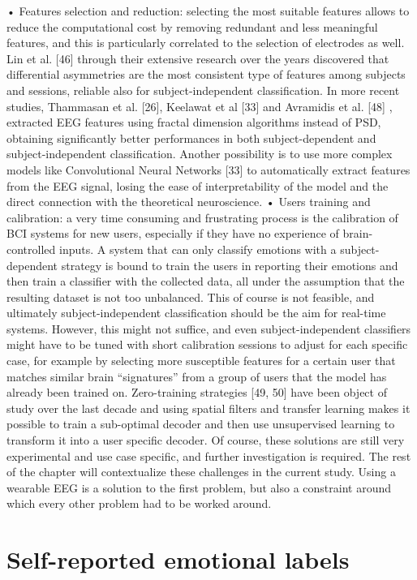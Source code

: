 •	Features selection and reduction: selecting the most suitable features allows to reduce the computational cost by removing redundant and less meaningful features, and this is particularly correlated to the selection of electrodes as well. Lin et al. [46] through their extensive research over the years discovered that differential asymmetries are the most consistent type of features among subjects and sessions, reliable also for subject-independent classification. In more recent studies, Thammasan et al. [26], Keelawat et al [33] and Avramidis et al. [48] , extracted EEG features using fractal dimension algorithms instead of PSD, obtaining significantly better performances in both subject-dependent and subject-independent classification. Another possibility is to use more complex models like Convolutional Neural Networks [33] to automatically extract features from the EEG signal, losing the ease of interpretability of the model and the direct connection with the theoretical neuroscience.
•	Users training and calibration: a very time consuming and frustrating process is the calibration of BCI systems for new users, especially if they have no experience of brain-controlled inputs. A system that can only classify emotions with a subject-dependent strategy is bound to train the users in reporting their emotions and then train a classifier with the collected data, all under the assumption that the resulting dataset is not too unbalanced. This of course is not feasible, and ultimately subject-independent classification should be the aim for real-time systems. However, this might not suffice, and even subject-independent classifiers might have to be tuned with short calibration sessions to adjust for each specific case, for example by selecting more susceptible features for a certain user that matches similar brain “signatures” from a group of users that the model has already been trained on. Zero-training strategies [49, 50] have been object of study over the last decade and using spatial filters and transfer learning makes it possible to train a sub-optimal decoder and then use unsupervised learning to transform it into a user specific decoder. Of course, these solutions are still very experimental and use case specific, and further investigation is required.
The rest of the chapter will contextualize these challenges in the current study. Using a wearable EEG is a solution to the first problem, but also a constraint around which every other problem had to be worked around.

\section{Self-reported emotional labels}

